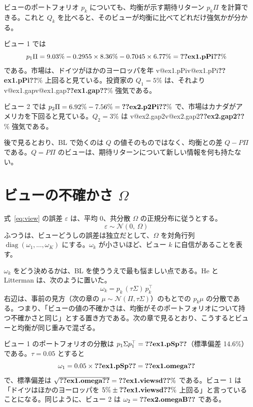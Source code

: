 \documentclass[xelatex,ja=standard,jafont=hiragino-pron,a4paper,11pt,openany]{bxjsreport}
\makeatletter
\newcommand{\V}[1]{\ifcsname v@#1\endcsname\csname v@#1\endcsname\else\textbf{??#1??}\fi}
\newcommand{\T}{^{\top}}
\DeclareMathOperator{\diag}{diag}
\makeatother
\begin{document}
ビューのポートフォリオ $p_k$ についても、均衡が示す期待リターン $p_k\Pi$ を計算できる。これと $Q_k$ を比べると、そのビューが均衡に比べてどれだけ強気かが分かる。

\begin{exbox}
ビュー 1 では
\[
p_1\Pi = 9.03\% - 0.2955 \times 8.36\% - 0.7045 \times 6.77\% = \V{ex1.pPi}\%
\]
である。市場は、ドイツがほかのヨーロッパを年 \V{ex1.pPi}\% 上回ると見ている。投資家の $Q_1 = 5\%$ は、それより \V{ex1.gap}\% 強気である。

ビュー 2 では $p_2\Pi = 6.92\% - 7.56\% = \V{ex2.p2Pi}\%$ で、市場はカナダがアメリカを下回ると見ている。$Q_2 = 3\%$ は \V{ex2.gap2}\% 強気である。
\end{exbox}

後で見るとおり、BL で効くのは $Q$ の値そのものではなく、均衡との差 $Q - P\Pi$ である。$Q = P\Pi$ のビューは、期待リターンについて新しい情報を何も持たない。

\section{ビューの不確かさ $\Omega$}

式~\eqref{eq:view} の誤差 $\varepsilon$ は、平均 0、共分散 $\Omega$ の正規分布に従うとする。
\begin{equation}
\varepsilon \sim \mathcal{N}(0,\ \Omega)
\end{equation}
ふつうは、ビューどうしの誤差は独立だとして、$\Omega$ を対角行列 $\diag(\omega_1, \dots, \omega_K)$ にする。$\omega_k$ が小さいほど、ビュー $k$ に自信があることを表す。

$\omega_k$ をどう決めるかは、BL を使ううえで最も悩ましい点である。He と Litterman は、次のように置いた。
\begin{equation}
\omega_k = p_k\,(\tau\Sigma)\,p_k\T
\label{eq:omegahl}
\end{equation}
右辺は、事前の見方（次の章の $\mu \sim \mathcal{N}(\Pi, \tau\Sigma)$）のもとでの $p_k\mu$ の分散である。つまり、「ビューの値の不確かさは、均衡がそのポートフォリオについて持つ不確かさと同じ」とする置き方である。次の章で見るとおり、こうするとビューと均衡が同じ重みで混ざる。

\begin{exbox}
ビュー 1 のポートフォリオの分散は $p_1\Sigma p_1\T = \V{ex1.pSp}$（標準偏差 14.6\%）である。$\tau = 0.05$ とすると
\[
\omega_1 = 0.05 \times \V{ex1.pSp} = \V{ex1.omega}
\]
で、標準偏差は $\sqrt{\V{ex1.omega}} = \V{ex1.viewsd}\%$ である。ビュー 1 は「ドイツはほかのヨーロッパを $5\% \pm \V{ex1.viewsd}\%$ 上回る」と言っていることになる。同じように、ビュー 2 は $\omega_2 = \V{ex2.omegaB}$ である。
\end{exbox}
\end{document}
